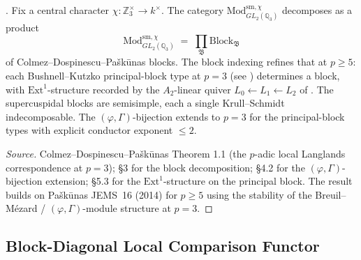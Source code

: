 \begin{theorem}[Colmez--Dospinescu--Pa{\v s}k{\=u}nas 2014 at \(p=3\)]
\label{v4-arith:w5-e:thm:CDP-p3}
\ClaimStatusProvedElsewhere. Fix a central character
\(\chi\colon\mathbb{Z}_{3}^{\times}\to k^{\times}\). The category
\(\mathrm{Mod}_{GL_{2}(\mathbb{Q}_{3})}^{\mathrm{sm},\chi}\) decomposes
as a product
\[
\mathrm{Mod}_{GL_{2}(\mathbb{Q}_{3})}^{\mathrm{sm},\chi}
\;=\;\prod_{\mathfrak{B}}\mathrm{Block}_{\mathfrak{B}}
\]
of Colmez--Dospinescu--Pa{\v s}k{\=u}nas blocks. The block indexing
refines that at \(p\geq 5\): each Bushnell--Kutzko principal-block type
at \(p=3\) (see ) determines a
block, with \(\mathrm{Ext}^{1}\)-structure recorded by the
\(A_{2}\)-linear quiver
\(L_{0}\leftarrow L_{1}\leftarrow L_{2}\) of
. The
supercuspidal blocks are semisimple, each a single Krull--Schmidt
indecomposable. The \((\varphi,\Gamma)\)-bijection extends to \(p=3\)
for the principal-block types with explicit conductor exponent
\(\leq 2\).
\end{theorem}

\begin{proof}[Source]
Colmez--Dospinescu--Pa{\v s}k{\=u}nas Theorem 1.1
(the \(p\)-adic local Langlands correspondence at \(p=3\)); \S 3 for the
block decomposition; \S 4.2 for the \((\varphi,\Gamma)\)-bijection
extension; \S 5.3 for the \(\mathrm{Ext}^{1}\)-structure on the
principal block. The result builds on Pa{\v s}k{\=u}nas JEMS~16 (2014) for
\(p\geq 5\) using the stability of the
Breuil--M{\'e}zard / \((\varphi,\Gamma)\)-module structure at \(p=3\).
\end{proof}

\subsection{Block-Diagonal Local Comparison Functor}

